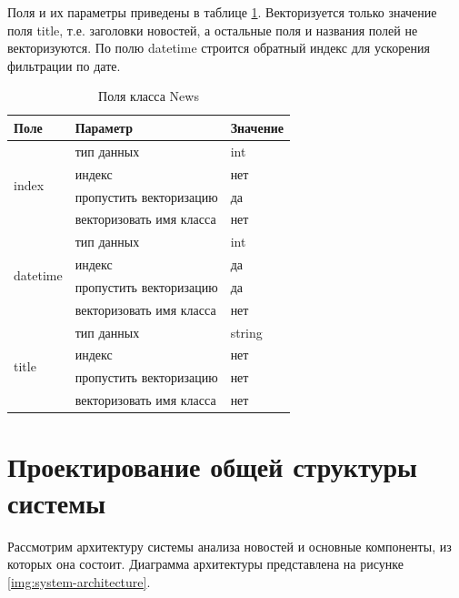 Поля и их параметры приведены в таблице \ref{tab:class-news-props}. Векторизуется только значение поля title, т.е. заголовки новостей, а остальные поля и названия полей не векторизуются. По полю datetime строится обратный индекс для ускорения фильтрации по дате.

\begin{table}[ht]
    \caption{Поля класса News}
    \label{tab:class-news-props}
    \begin{tabularx}{\textwidth}{|l|X|X|}
        \hline
        Поле & Параметр & Значение \\
        \hline
        \multirow{4}{*}{index} & тип данных & int \\
            \cline{2-3}
            & индекс & нет \\
            \cline{2-3}
            & пропустить векторизацию & да \\
            \cline{2-3}
            & векторизовать имя класса & нет \\
        \hline
        \multirow{4}{*}{datetime} & тип данных & int \\
            \cline{2-3}
            & индекс & да \\
            \cline{2-3}
            & пропустить векторизацию & да \\
            \cline{2-3}
            & векторизовать имя класса & нет \\
        \hline
        \multirow{4}{*}{title} & тип данных & string \\
            \cline{2-3}
            & индекс & нет \\
            \cline{2-3}
            & пропустить векторизацию & нет \\
            \cline{2-3}
            & векторизовать имя класса & нет \\
        \hline
    \end{tabularx}
\end{table}

\section{Проектирование общей структуры системы}

Рассмотрим архитектуру системы анализа новостей и основные компоненты, из которых она состоит. Диаграмма архитектуры представлена на рисунке \ref{img:system-architecture}.

